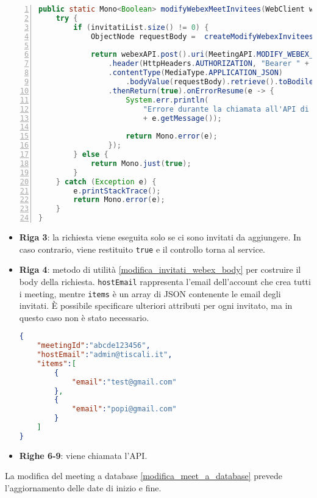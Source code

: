 \begin{lstlisting}[language=java, frame=lines, basicstyle=\ttfamily\scriptsize, numbers=left, 
	caption={chiamata all'API per aggiungere invitati su Webex}, label={modifica_invitati_webex}]
public static Mono<Boolean> modifyWebexMeetInvitees(WebClient webexAPI, JsonNode evento, List<String> invitatiList) {
	try {		
		if (invitatiList.size() != 0) {		
			ObjectNode requestBody =  createModifyWebexInviteesBody(evento, invitatiList);

			return webexAPI.post().uri(MeetingAPI.MODIFY_WEBEX_MEET_INVITEES)
				.header(HttpHeaders.AUTHORIZATION, "Bearer " + MeetingAPI.TOKEN)
				.contentType(MediaType.APPLICATION_JSON)
					.bodyValue(requestBody).retrieve().toBodilessEntity()
				.thenReturn(true).onErrorResume(e -> {
					System.err.println(
						"Errore durante la chiamata all'API di Webex per l'aggiunta degli invitati a un meet: "
						+ e.getMessage());

				    return Mono.error(e);
				});
		} else {
			return Mono.just(true);
		}
	} catch (Exception e) {
		e.printStackTrace();
		return Mono.error(e);
	}
}
\end{lstlisting}
\begin{itemize}
    \item \textbf{Riga 3}: la richiesta viene eseguita solo se ci sono invitati da aggiungere. In caso contrario, viene restituito 
    \texttt{true} e il controllo torna al service.

    \item \textbf{Riga 4}: metodo di utilità \ref{modifica_invitati_webex_body} per costruire il body della richiesta. 
    \texttt{hostEmail} rappresenta l'email dell'account che crea tutti i meeting, 
    mentre \texttt{items} è un array di JSON contenente le email degli invitati. È possibile specificare ulteriori attributi
     per ogni invitato, ma in questo caso non è stato necessario.
    \begin{lstlisting}[language=json, caption={body per aggiungere invitati su Webex}, label={modifica_invitati_webex_body}]
{
    "meetingId":"abcde123456",
    "hostEmail":"admin@tiscali.it",
    "items":[
        {
            "email":"test@gmail.com"
        },
        {
            "email":"popi@gmail.com"
        }
    ]
}
    \end{lstlisting}

    \item \textbf{Righe 6-9}: viene chiamata l'API.
\end{itemize}
La modifica del meeting a database \ref{modifica_meet_a_database} prevede l'aggiornamento delle date di inizio e fine. 
